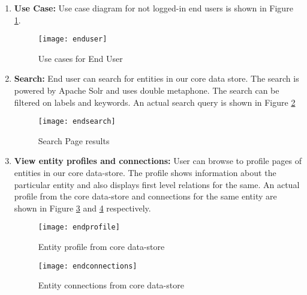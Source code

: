 \begin{enumerate}

\item \textbf{Use Case:} Use case diagram for not logged-in end users is shown in Figure \ref{fig:enduser}.

\begin{figure}[H]
\begin{center}  
\texttt{[image: enduser]} 
\caption{Use cases for End User}
\label{fig:enduser}
\end{center}
\end{figure}




\item \textbf{Search:} End user can search for entities in our core data store. The search is powered by Apache Solr and uses double metaphone. The search can be filtered on labels and keywords. An actual search query is shown in Figure \ref{fig:endsearch} 

\begin{figure}[H]
\begin{center}  
\texttt{[image: endsearch]} 
\caption{Search Page results}
\label{fig:endsearch}
\end{center}
\end{figure}


\item \textbf{View entity profiles and connections:} User can browse to profile pages of entities in our core data-store. The profile shows information about the particular entity and also displays first level relations for the same. An actual profile from the core data-store and connections for the same entity are shown in Figure \ref{fig:endprofile} and \ref{fig:endconnections} respectively.


\begin{figure}[H]
\begin{center}  
\texttt{[image: endprofile]} 
\caption{Entity profile from core data-store}
\label{fig:endprofile}
\end{center}
\end{figure}



\begin{figure}[H]
\begin{center}  
\texttt{[image: endconnections]} 
\caption{Entity connections from core data-store}
\label{fig:endconnections}
\end{center}
\end{figure}



\end{enumerate}
